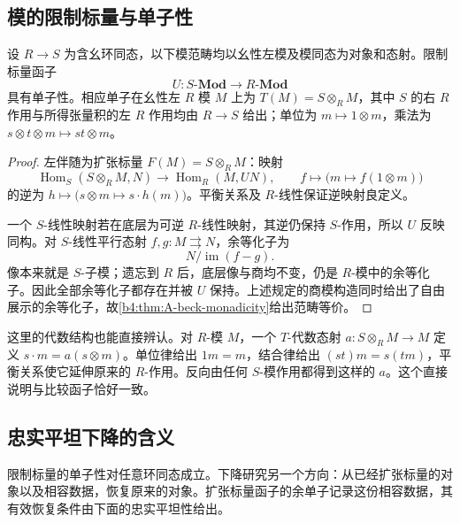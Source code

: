 \subsection{模的限制标量与单子性}
\label{b4:subsec:A03:03}

\begin{proposition}\label{b4:prop:A-restriction-scalars-monadic}
	设 \(R\to S\) 为含幺环同态，以下模范畴均以幺性左模及模同态为对象和态射。限制标量函子
	\[
		U:S\text{-}\mathbf{Mod}\longrightarrow R\text{-}\mathbf{Mod}
	\]
	具有单子性。相应单子在幺性左 \(R\) 模 \(M\) 上为 \(T(M)=S\otimes_RM\)，其中 \(S\) 的右 \(R\) 作用与所得张量积的左 \(R\) 作用均由 \(R\to S\) 给出；单位为 \(m\mapsto1\otimes m\)，乘法为 \(s\otimes t\otimes m\mapsto st\otimes m\)。
\end{proposition}
\begin{proof}
	左伴随为扩张标量 \(F(M)=S\otimes_RM\)：映射
	\[
		\operatorname{Hom}_S(S\otimes_RM,N)\longrightarrow \operatorname{Hom}_R(M,UN),\qquad f\longmapsto\bigl(m\mapsto f(1\otimes m)\bigr)
	\]
	的逆为 \(h\mapsto\bigl(s\otimes m\mapsto s\cdot h(m)\bigr)\)。平衡关系及 \(R\)-线性保证逆映射良定义。

	一个 \(S\)-线性映射若在底层为可逆 \(R\)-线性映射，其逆仍保持 \(S\)-作用，所以 \(U\) 反映同构。对 \(S\)-线性平行态射 \(f,g:M\rightrightarrows N\)，余等化子为
	\[
		N/\operatorname{im}(f-g).
	\]
	像本来就是 \(S\)-子模；遗忘到 \(R\) 后，底层像与商均不变，仍是 \(R\)-模中的余等化子。因此全部余等化子都存在并被 \(U\) 保持。上述规定的商模构造同时给出了自由展示的余等化子，故\cref{b4:thm:A-beck-monadicity}给出范畴等价。
\end{proof}

这里的代数结构也能直接辨认。对 \(R\)-模 \(M\)，一个 \(T\)-代数态射 \(a:S\otimes_RM\to M\) 定义 \(s\cdot m=a(s\otimes m)\)。单位律给出 \(1m=m\)，结合律给出 \((st)m=s(tm)\)，平衡关系使它延伸原来的 \(R\)-作用。反向由任何 \(S\)-模作用都得到这样的 \(a\)。这个直接说明与比较函子恰好一致。

\subsection{忠实平坦下降的含义}
\label{b4:subsec:A03:04}

限制标量的单子性对任意环同态成立。下降研究另一个方向：从已经扩张标量的对象以及相容数据，恢复原来的对象。扩张标量函子的余单子记录这份相容数据，其有效恢复条件由下面的忠实平坦性给出。

